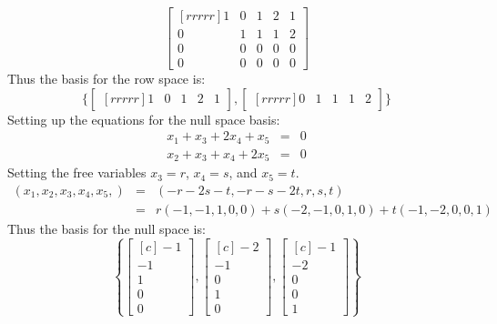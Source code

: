 \begin{solution}
$$\begin{bmatrix}[rrrrr]
1&0&1&2&1\\
0&1&1&1&2\\
0&0&0&0&0\\
0&0&0&0&0
\end{bmatrix}
$$
Thus the basis for the row space is:
$$
\{
\begin{bmatrix}[rrrrr]
1&0&1&2&1
\end{bmatrix},
\begin{bmatrix}[rrrrr]
0&1&1&1&2
\end{bmatrix}\}
$$
Setting up the equations for the null space basis:
\begin{eqnarray*}
x_1 + x_3+ 2x_4+x_5 &=& 0\\
x_2+x_3+x_4+2x_5 &=& 0
\end{eqnarray*}
Setting the free variables $x_3 = r$, $x_4 = s$, and $x_5 = t$.
\begin{eqnarray*}
(x_1,x_2,x_3,x_4,x_5,) &=& (-r-2s-t,-r-s-2t,r,s,t)\\
&=& r(-1,-1,1,0,0) + s(-2,-1,0,1,0) + t(-1,-2,0,0,1) 
\end{eqnarray*}
Thus the basis for the null space is:
$$
\left\{
\begin{bmatrix}[c]
-1\\
-1\\
1\\
0\\
0
\end{bmatrix},
\begin{bmatrix}[c]
-2\\
-1\\
0\\
1\\
0
\end{bmatrix},
\begin{bmatrix}[c]
-1\\
-2\\
0\\
0\\
1
\end{bmatrix}
\right\}
$$
\end{solution}

